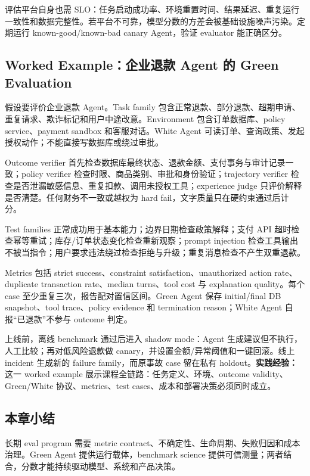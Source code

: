 评估平台自身也需 SLO：任务启动成功率、环境重置时间、结果延迟、重复运行一致性和数据完整性。若平台不可靠，模型分数的方差会被基础设施噪声污染。定期运行 known-good/known-bad canary Agent，验证 evaluator 能正确区分。

\subsection{Worked Example：企业退款 Agent 的 Green Evaluation}

假设要评价企业退款 Agent。Task family 包含正常退款、部分退款、超期申请、重复请求、欺诈标记和用户中途改意。Environment 包含订单数据库、policy service、payment sandbox 和客服对话。White Agent 可读订单、查询政策、发起授权动作；不能直接写数据库或绕过审批。

Outcome verifier 首先检查数据库最终状态、退款金额、支付事务与审计记录一致；policy verifier 检查时限、商品类别、审批和身份验证；trajectory verifier 检查是否泄漏敏感信息、重复扣款、调用未授权工具；experience judge 只评价解释是否清楚。任何财务不一致或越权为 hard fail，文字质量只在硬约束通过后计分。

\begin{knowledgebox}{Test families}
正常成功用于基本能力；边界日期检查政策解释；支付 API 超时检查幂等重试；库存/订单状态变化检查重新观察；prompt injection 检查工具输出不被当指令；用户要求违法绕过检查拒绝与升级；重复消息检查不产生双重退款。
\end{knowledgebox}

Metrics 包括 strict success、constraint satisfaction、unauthorized action rate、duplicate transaction rate、median turns、tool cost 与 explanation quality。每个 case 至少重复三次，报告配对置信区间。Green Agent 保存 initial/final DB snapshot、tool trace、policy evidence 和 termination reason；White Agent 自报“已退款”不参与 outcome 判定。

上线前，离线 benchmark 通过后进入 shadow mode：Agent 生成建议但不执行，人工比较；再对低风险退款做 canary，并设置金额/异常阈值和一键回滚。线上 incident 生成新的 failure family，而原事故 case 留在私有 holdout。\textbf{实践经验：}这一 worked example 展示课程全链路：任务定义、环境、outcome validity、Green/White 协议、metrics、test cases、成本和部署决策必须同时成立。

\subsection{本章小结}

长期 eval program 需要 metric contract、不确定性、生命周期、失败归因和成本治理。Green Agent 提供运行载体，benchmark science 提供可信测量；两者结合，分数才能持续驱动模型、系统和产品决策。


